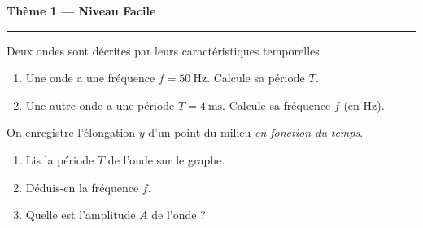 \documentclass[11pt,a4paper]{article}
\begin{document}
\begin{center}
{\large\bfseries\color{primarydark} Thème 1 — Niveau Facile}\\[-2pt]
{\color{primary}\rule{5cm}{1pt}}
\end{center}

\begin{exo}
Deux ondes sont décrites par leurs caractéristiques temporelles.
\begin{enumerate}[label=\alph*)]
  \item Une onde a une fréquence $f=\SI{50}{\hertz}$. Calcule sa période $T$.
  \item Une autre onde a une période $T=\SI{4}{\milli\second}$. Calcule sa fréquence $f$
        (en \si{\hertz}).
\end{enumerate}
\end{exo}

\begin{exo}
On enregistre l'élongation $y$ d'un point du milieu \emph{en fonction du temps}.
\begin{center}
\end{center}
\begin{enumerate}[label=\alph*)]
  \item Lis la période $T$ de l'onde sur le graphe.
  \item Déduis-en la fréquence $f$.
  \item Quelle est l'amplitude $A$ de l'onde ?
\end{enumerate}
\end{exo}
\end{document}
